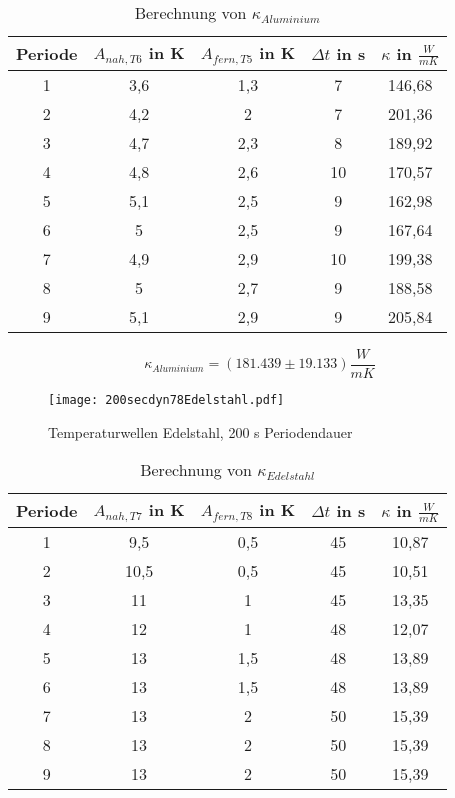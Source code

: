 \begin{table}[H]
  \centering
  \caption{Berechnung von $\kappa_{Aluminium}$}
  \label{tab:5}
  \begin{tabular}{c c c c c}
    \toprule
   Periode &   $A_{nah,T6}$ in K &  $A_{fern,T5}$ in K &  $\Delta t$ in s & $\kappa$ in $\frac{W}{mK}$ \\
    \midrule
    1 & 3,6 & 1,3 & 7 & 146,68 \\
    2 & 4,2 & 2 & 7 & 201,36 \\
    3 & 4,7 & 2,3 & 8 & 189,92\\
    4 & 4,8 & 2,6 & 10 & 170,57\\
    5 & 5,1 & 2,5 & 9 & 162,98 \\
    6 & 5 & 2,5 & 9 & 167,64 \\
    7 & 4,9 & 2,9 & 10 & 199,38 \\
    8 & 5 & 2,7 & 9 & 188,58 \\
    9 & 5,1 & 2,9 & 9 & 205,84 \\
    \bottomrule
  \end{tabular}
\end{table}
$$\kappa_{Aluminium} =(181.439 \pm 19.133) \frac{W}{mK}$$
\begin{figure}[H]
  \centering
  \texttt{[image: 200secdyn78Edelstahl.pdf]}
  \caption{Temperaturwellen Edelstahl, 200 s Periodendauer}
  \label{fig:7}
\end{figure}
\begin{table}[H]
  \centering
  \caption{Berechnung von $\kappa_{Edelstahl}$}
  \label{tab:6}
  \begin{tabular}{c c c c c}
    \toprule
   Periode &   $A_{nah,T7}$ in K &  $A_{fern,T8}$ in K &  $\Delta t$ in s & $\kappa$ in $\frac{W}{mK}$ \\
    \midrule
    1 & 9,5 & 0,5 & 45 & 10,87 \\
    2 & 10,5 & 0,5 & 45 & 10,51 \\
    3 & 11 & 1 & 45 & 13,35\\
    4 & 12 & 1 & 48 & 12,07\\
    5 & 13 & 1,5 & 48 & 13,89 \\
    6 & 13 & 1,5 & 48 & 13,89 \\
    7 & 13 & 2 & 50 & 15,39 \\
    8 & 13 & 2 & 50 & 15,39 \\
    9 & 13 & 2 & 50 & 15,39 \\
    \bottomrule
  \end{tabular}
\end{table}
